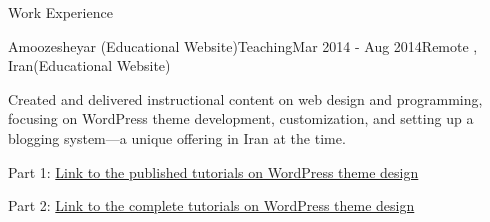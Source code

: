 \documentclass[]{kyvernitis-resume}
\begin{document}
\begin{section}{Work Experience}
 \begin{subsection}{Amoozesheyar (Educational Website)}{Teaching}{Mar 2014 - Aug 2014}{Remote , Iran}{(Educational Website)}
	\item Created and delivered instructional content on web design and programming, focusing on WordPress theme development, customization, and setting up a blogging system—a unique offering in Iran at the time.
	\item Part 1:  \href{https://www.daneshjooyar.com/%d9%82%d8%b3%d9%85%d8%aa-%d9%86%d9%87%d8%a7%db%8c%db%8c-%d8%b3%d8%b1%db%8c-%d8%a2%d9%85%d9%88%d8%b2%d8%b4%db%8c-%d8%b7%d8%b1%d8%a7%d8%ad%db%8c-%d9%82%d8%a7%d9%84%d8%a8-%d9%88%d8%b1%d8%af%d9%be%d8%b1/}{Link to the published tutorials on WordPress theme design} 
	\item Part 2: \href{https://www.daneshjooyar.com/%d8%a2%d9%85%d9%88%d8%b2%d8%b4-%d8%b7%d8%b1%d8%a7%d8%ad%db%8c-%d9%82%d8%a7%d9%84%d8%a8-%d9%88%d8%b1%d8%af%d9%be%d8%b1%d8%b3-%d8%aa%d9%85%d8%a7%d9%85%db%8c-%d9%82%d8%b3%d9%85%d8%aa-%d9%87%d8%a7-%d9%82/}{Link to the complete tutorials on WordPress theme design}
    \end{subsection}
    
\end{section}
\end{document}
